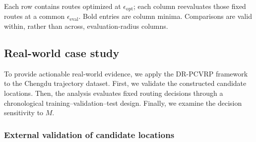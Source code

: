 \documentclass[preprint,12pt,authoryear]{elsarticle}
\theoremstyle{definition}
\begin{document}
{\begin{table}[htbp]
\centering
\caption{Cross-evaluation of Wasserstein optimization and evaluation radii with the same POMO-NS outer search. Entries are mean exact objectives in $\times10^3$ over ten instances and three seeds; lower is better.}
\label{tab:exact_dro_robustness_ablation}
\small
{}
\parbox{0.97\textwidth}{\footnotesize Each row contains routes optimized at $\epsilon_{\mathrm{opt}}$; each column reevaluates those fixed routes at a common $\epsilon_{\mathrm{eval}}$. Bold entries are column minima. Comparisons are valid within, rather than across, evaluation-radius columns.}
\end{table}
}



\subsection{Real-world case study}
To provide actionable real-world evidence, we apply the DR-PCVRP framework to the Chengdu trajectory dataset. 
First, we validate the constructed candidate locations. 
Then, the analysis evaluates fixed routing decisions through a chronological training--validation--test design.
Finally, we examine the decision sensitivity to $M$.

\subsubsection{External validation of candidate locations}
\label{sec:location_prize_validation}
\end{document}
